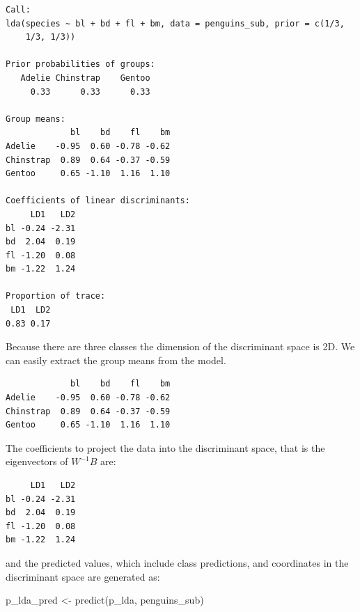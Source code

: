 \documentclass[
  letterpaper,
]{book}
\newenvironment{Shaded}{\begin{snugshade}}{\end{snugshade}}
\newcommand{\FunctionTok}[1]{\textcolor[rgb]{0.28,0.35,0.67}{#1}}
\newcommand{\NormalTok}[1]{\textcolor[rgb]{0.00,0.23,0.31}{#1}}
\newcommand{\OtherTok}[1]{\textcolor[rgb]{0.00,0.23,0.31}{#1}}
\newcommand{\SpecialCharTok}[1]{\textcolor[rgb]{0.37,0.37,0.37}{#1}}
\begin{document}
\begin{verbatim}
Call:
lda(species ~ bl + bd + fl + bm, data = penguins_sub, prior = c(1/3, 
    1/3, 1/3))

Prior probabilities of groups:
   Adelie Chinstrap    Gentoo 
     0.33      0.33      0.33 

Group means:
             bl    bd    fl    bm
Adelie    -0.95  0.60 -0.78 -0.62
Chinstrap  0.89  0.64 -0.37 -0.59
Gentoo     0.65 -1.10  1.16  1.10

Coefficients of linear discriminants:
     LD1   LD2
bl -0.24 -2.31
bd  2.04  0.19
fl -1.20  0.08
bm -1.22  1.24

Proportion of trace:
 LD1  LD2 
0.83 0.17 
\end{verbatim}

Because there are three classes the dimension of the discriminant space
is 2D. We can easily extract the group means from the model.

\begin{Shaded}
\end{Shaded}

\begin{verbatim}
             bl    bd    fl    bm
Adelie    -0.95  0.60 -0.78 -0.62
Chinstrap  0.89  0.64 -0.37 -0.59
Gentoo     0.65 -1.10  1.16  1.10
\end{verbatim}

The coefficients to project the data into the discriminant space, that
is the eigenvectors of \(W^{-1}B\) are:

\begin{Shaded}
\end{Shaded}

\begin{verbatim}
     LD1   LD2
bl -0.24 -2.31
bd  2.04  0.19
fl -1.20  0.08
bm -1.22  1.24
\end{verbatim}

and the predicted values, which include class predictions, and
coordinates in the discriminant space are generated as:

\begin{Shaded}
\begin{Highlighting}[]
\NormalTok{p\_lda\_pred }\OtherTok{\textless{}{-}} \FunctionTok{predict}\NormalTok{(p\_lda, penguins\_sub)}
\end{Highlighting}
\end{Shaded}
\end{document}

